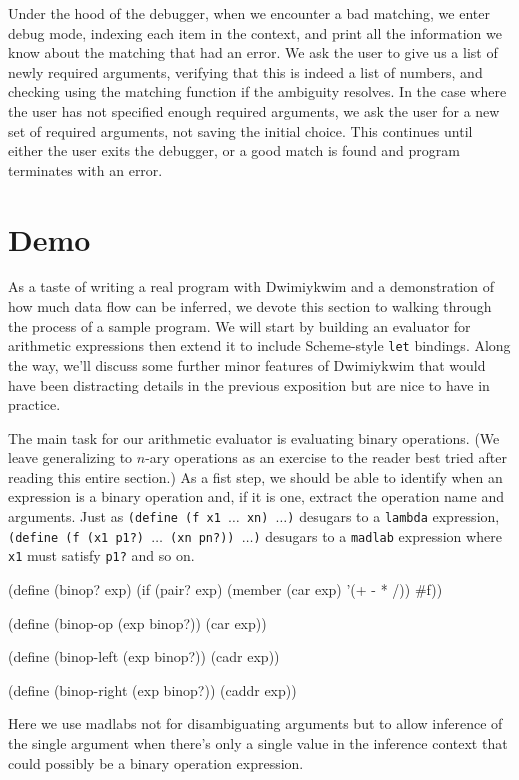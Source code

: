 \documentclass[11pt]{article}
\begin{document}
Under the hood of the debugger, when we encounter a bad matching,
we enter debug mode, indexing each item in the context,
and print all the information we know about the matching that had an error.
We ask the user to give us a list of newly required arguments,
verifying that this is indeed a list of numbers,
and checking using the matching function if the ambiguity resolves.
In the case where the user has not specified enough required arguments,
we ask the user for a new set of required arguments,
not saving the initial choice.
This continues until either the user exits the debugger,
or a good match is found and program terminates with an error.


\section{Demo}

As a taste of writing a real program with Dwimiykwim
and a demonstration of how much data flow can be inferred,
we devote this section to walking through the process of a sample program.
We will start by building an evaluator for arithmetic expressions
then extend it to include Scheme-style \texttt{let} bindings.
Along the way, we'll discuss some further minor features of Dwimiykwim
that would have been distracting details in the previous exposition
but are nice to have in practice.

The main task for our arithmetic evaluator is evaluating binary operations.
(We leave generalizing to $n$-ary operations as an exercise to the reader
best tried after reading this entire section.)
As a fist step, we should be able to identify
when an expression is a binary operation
and, if it is one, extract the operation name and arguments.
Just as \texttt{(define (f x1 $\dots$ xn) $\dots$)}
desugars to a \texttt{lambda} expression,
\texttt{(define (f (x1 p1?) $\dots$ (xn pn?)) $\dots$)}
desugars to a \texttt{madlab} expression
where \texttt{x1} must satisfy \texttt{p1?} and so on.
\begin{verbbox}
(define (binop? exp)
  (if (pair? exp)
      (member (car exp) '(+ - * /))
      #f))

(define (binop-op (exp binop?))
  (car exp))

(define (binop-left (exp binop?))
  (cadr exp))

(define (binop-right (exp binop?))
  (caddr exp))
\end{verbbox}
\begin{center}\theverbbox\end{center}
Here we use madlabs not for disambiguating arguments
but to allow inference of the single argument
when there's only a single value in the inference context
that could possibly be a binary operation expression.
\end{document}
